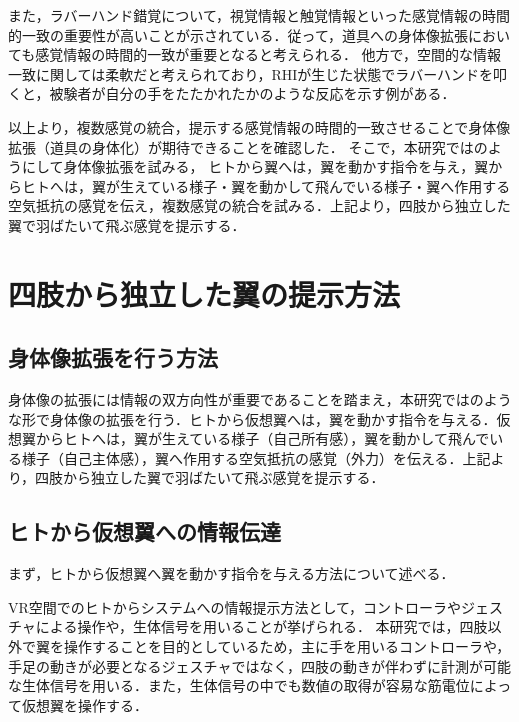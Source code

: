\begin{small}
    また，ラバーハンド錯覚について，視覚情報と触覚情報といった感覚情報の時間的一致の重要性が高いことが示されている\cite{本間元康2010ラバーハンドイリュージョン}\cite{ehrsson2007experimental}\cite{shimada2009rubber}．従って，道具への身体像拡張においても感覚情報の時間的一致が重要となると考えられる．
    他方で，空間的な情報一致に関しては柔軟だと考えられており，RHIが生じた状態でラバーハンドを叩くと，被験者が自分の手をたたかれたかのような反応を示す例がある\cite{armel2003projecting}．


    以上より，複数感覚の統合，提示する感覚情報の時間的一致させることで身体像拡張（道具の身体化）が期待できることを確認した．
    そこで，本研究ではのようにして身体像拡張を試みる，
    ヒトから翼へは，翼を動かす指令を与え，翼からヒトへは，翼が生えている様子・翼を動かして飛んでいる様子・翼へ作用する空気抵抗の感覚を伝え，複数感覚の統合を試みる．上記より，四肢から独立した翼で羽ばたいて飛ぶ感覚を提示する．


\section{四肢から独立した翼の提示方法}

  \subsection{身体像拡張を行う方法}
    身体像の拡張には情報の双方向性が重要であることを踏まえ，本研究ではのような形で身体像の拡張を行う．ヒトから仮想翼へは，翼を動かす指令を与える．仮想翼からヒトへは，翼が生えている様子（自己所有感），翼を動かして飛んでいる様子（自己主体感），翼へ作用する空気抵抗の感覚（外力）を伝える．上記より，四肢から独立した翼で羽ばたいて飛ぶ感覚を提示する．

  \subsection{ヒトから仮想翼への情報伝達}
    まず，ヒトから仮想翼へ翼を動かす指令を与える方法について述べる．

    VR空間でのヒトからシステムへの情報提示方法として，コントローラやジェスチャによる操作や，生体信号を用いることが挙げられる．
    本研究では，四肢以外で翼を操作することを目的としているため，主に手を用いるコントローラや，手足の動きが必要となるジェスチャではなく，四肢の動きが伴わずに計測が可能な生体信号を用いる．また，生体信号の中でも数値の取得が容易な筋電位によって仮想翼を操作する．


\end{small}

